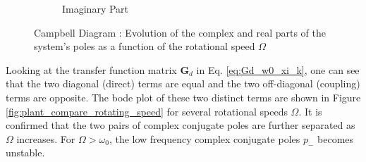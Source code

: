 \documentclass{ISMA_USD2020}
\begin{document}
\begin{figure}[htbp]
\begin{subfigure}[c]{0.4\linewidth}
\caption{\label{fig:campbell_diagram_imag} Imaginary Part}
\end{subfigure}
\caption{\label{fig:campbell_diagram}Campbell Diagram : Evolution of the complex and real parts of the system's poles as a function of the rotational speed \(\Omega\)}
\centering
\end{figure}

Looking at the transfer function matrix \(\bm{G}_d\) in Eq. \eqref{eq:Gd_w0_xi_k}, one can see that the two diagonal (direct) terms are equal and the two off-diagonal (coupling) terms are opposite.
The bode plot of these two distinct terms are shown in Figure \ref{fig:plant_compare_rotating_speed} for several rotational speeds \(\Omega\).
It is confirmed that the two pairs of complex conjugate poles are further separated as \(\Omega\) increases.
For \(\Omega > \omega_0\), the low frequency complex conjugate poles \(p_{-}\) becomes unstable.
\end{document}
